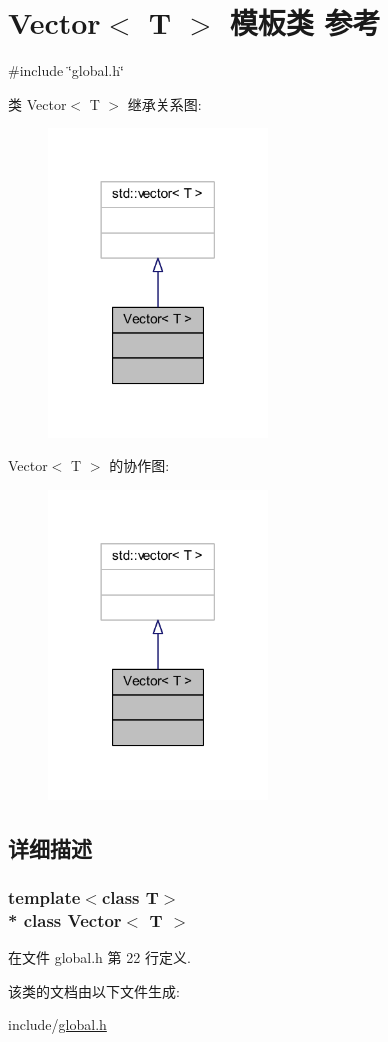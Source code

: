 \hypertarget{classVector}{}\section{Vector$<$ T $>$ 模板类 参考}
\label{classVector}


{\ttfamily \#include \char`\"{}global.\+h\char`\"{}}



类 Vector$<$ T $>$ 继承关系图\+:
\nopagebreak
\begin{figure}[H]
\begin{center}
\leavevmode
\includegraphics[width=165pt]{classVector__inherit__graph}
\end{center}
\end{figure}


Vector$<$ T $>$ 的协作图\+:
\nopagebreak
\begin{figure}[H]
\begin{center}
\leavevmode
\includegraphics[width=165pt]{classVector__coll__graph}
\end{center}
\end{figure}


\subsection{详细描述}
\subsubsection*{template$<$class T$>$\\*
class Vector$<$ T $>$}



在文件 global.\+h 第 22 行定义.



该类的文档由以下文件生成\+:\begin{DoxyCompactItemize}
\item 
include/\hyperlink{global_8h}{global.\+h}\end{DoxyCompactItemize}
